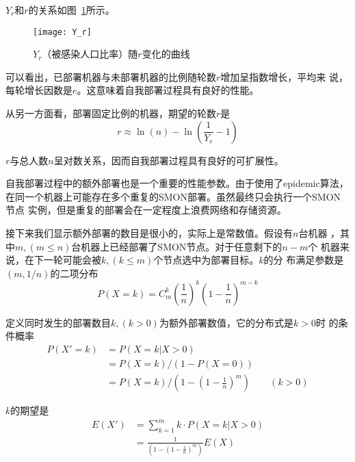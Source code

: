 $Y_r$和$r$的关系如图~\ref{fig:self-deploy_Yr}所示。

\begin{figure}
\centering
  \begin{minipage}{0.8\linewidth}
    \centering
    \texttt{[image: Y\_r]}
    \caption{$Y_r$（被感染人口比率）随$r$变化的曲线}
    \label{fig:self-deploy_Yr}
  \end{minipage}
\end{figure}

可以看出，已部署机器与未部署机器的比例随轮数$r$增加呈指数增长，平均来
说，每轮增长因数是$e$。这意味着自我部署过程具有良好的性能。

从另一方面看，部署固定比例的机器，期望的轮数$r$是
\begin{equation*}
r \approx \ln(n) - \ln(\frac{1}{Y_r} - 1)
\end{equation*}

$r$与总人数$n$呈对数关系，因而自我部署过程具有良好的可扩展性。

自我部署过程中的额外部署也是一个重要的性能参数。由于使用了epidemic算法，
在同一个机器上可能存在多个重复的SMON部署。虽然最终只会执行一个SMON节点
实例，但是重复的部署会在一定程度上浪费网络和存储资源。

接下来我们显示额外部署的数目是很小的，实际上是常数值。假设有$n$台机器
，其中$m, (m \le n)$台机器上已经部署了SMON节点。对于任意剩下的$n-m$个
机器来说，在下一轮可能会被$k, (k \le m)$个节点选中为部署目标。$k$的分
布满足参数是$(m, 1/n)$的二项分布
\begin{equation*}
P(X=k) = C_m^k (\frac{1}{n})^k (1 - \frac{1}{n})^{m - k}
\end{equation*}

定义同时发生的部署数目$k, (k > 0) $为额外部署数值，它的分布式是$k>0$时
的条件概率
\begin{equation*}
\begin{aligned}
P(X' = k) &= P(X=k | X > 0) \\
&= P(X = k) / (1 - P(X = 0)) \\ 
&= P(X = k) / (1 - (1 - \frac{1}{n})^{m}) \qquad (k > 0)
\end{aligned}
\end{equation*}

$k$的期望是
\begin{equation*}
\begin{aligned}
E(X') &= \sum_{k=1}^m k \cdot P(X=k|X>0)  \\
      &= \frac{1}{(1 - (1 - \frac{1}{n})^{m})} E(X)
\end{aligned}
\end{equation*}

